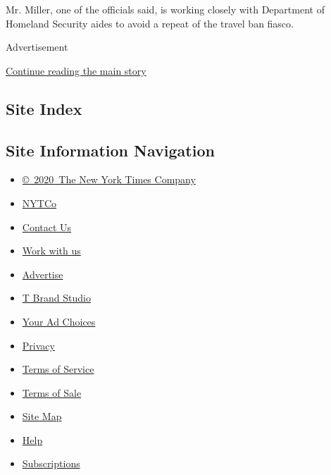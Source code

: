 Mr. Miller, one of the officials said, is working closely with
Department of Homeland Security aides to avoid a repeat of the travel
ban fiasco.

Advertisement

\protect\hyperlink{after-bottom}{Continue reading the main story}

\hypertarget{site-index}{%
\subsection{Site Index}\label{site-index}}

\hypertarget{site-information-navigation}{%
\subsection{Site Information
Navigation}\label{site-information-navigation}}

\begin{itemize}
\tightlist
\item
  \href{https://help.nytimes.com/hc/en-us/articles/115014792127-Copyright-notice}{©~2020~The
  New York Times Company}
\end{itemize}

\begin{itemize}
\tightlist
\item
  \href{https://www.nytco.com/}{NYTCo}
\item
  \href{https://help.nytimes.com/hc/en-us/articles/115015385887-Contact-Us}{Contact
  Us}
\item
  \href{https://www.nytco.com/careers/}{Work with us}
\item
  \href{https://nytmediakit.com/}{Advertise}
\item
  \href{http://www.tbrandstudio.com/}{T Brand Studio}
\item
  \href{https://www.nytimes.com/privacy/cookie-policy\#how-do-i-manage-trackers}{Your
  Ad Choices}
\item
  \href{https://www.nytimes.com/privacy}{Privacy}
\item
  \href{https://help.nytimes.com/hc/en-us/articles/115014893428-Terms-of-service}{Terms
  of Service}
\item
  \href{https://help.nytimes.com/hc/en-us/articles/115014893968-Terms-of-sale}{Terms
  of Sale}
\item
  \href{https://spiderbites.nytimes.com}{Site Map}
\item
  \href{https://help.nytimes.com/hc/en-us}{Help}
\item
  \href{https://www.nytimes.com/subscription?campaignId=37WXW}{Subscriptions}
\end{itemize}
